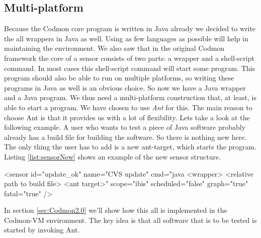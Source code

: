 \documentclass{article}
\newcommand{\project}{Codmon-VM}
\begin{document}
\subsection{Multi-platform}
\label{road:multi}
Because the Codmon core program is written in Java already we decided to write the all wrappers in Java as well. Using as few languages as possible will help in maintaining the environment. 
We also saw that in the original Codmon framework the core of a sensor consists of two parts: a wrapper and a shell-script command. In most cases this shell-script command will start some 
program. This program should also be able to run on multiple platforms, so writing these programs in Java as well is an obvious choice. So now we have a Java wrapper and a Java program. We thus need a 
multi-platform construction that, at least, is able to start a program. We have chosen to use \emph{Ant} for this. The main reason to choose Ant is that it provides us with a lot of flexibility. Lets take 
a look at the following example. A user who wants to test a piece of Java software probably already has a build file for building the software. So there is nothing new here. The only thing the user has 
to add is a new ant-target, which starts the program. Listing \ref{list:sensorNew} shows an example of the new sensor structure.

\begin{code}[frame=shadowbox, language=XML,showstringspaces=false]
 <sensor id="update_ok" 
    name="CVS update" 
    cmd="java <wrapper> <relative path to build file> <ant target>" 
    scope="ibis" 
    scheduled="false" 
    graph="true" 
    fatal="true" />
\end{code}

In section \ref{sec:Codmon2.0} we'll show how this all is implemented in the \project{} environment. The key idea is that all software that is to be tested is started by invoking Ant.\\
\end{document}
